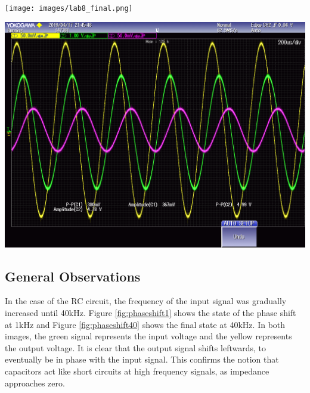 \documentclass[journal]{IEEEtran}
\begin{document}
\begingroup
    \centering
    \medskip
    \texttt{[image: images/lab8\_final.png]}
    \label{fig:phaseshift1}
    \medskip
\endgroup



\begingroup
    \centering
    \medskip
    \includegraphics[width=\columnwidth]{images/lab8_029.png}
    \label{fig:rlcosc2}
    \medskip
\endgroup

\subsection{General Observations}

\noindent In the case of the RC circuit, the frequency of the input signal was gradually increased until 40kHz. Figure \ref{fig:phaseshift1} shows the state of the phase shift at 1kHz and Figure \ref{fig:phaseshift40} shows the final state at 40kHz. In both images, the green signal represents the input voltage and the yellow represents the output voltage. It is clear that the output signal shifts leftwards, to eventually be in phase with the input signal. This confirms the notion that capacitors act like short circuits at high frequency signals, as impedance approaches zero.  \\
\end{document}
